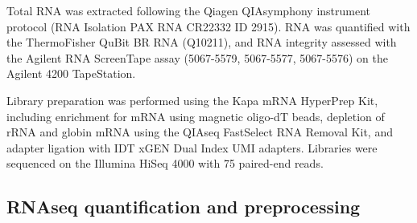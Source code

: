 %

Total RNA was extracted following the Qiagen QIAsymphony instrument protocol (RNA Isolation PAX RNA CR22332 ID 2915).
RNA was quantified with the ThermoFisher QuBit BR RNA (Q10211), 
and RNA integrity assessed with the Agilent RNA ScreenTape assay (5067-5579, 5067-5577, 5067-5576) on the Agilent 4200 TapeStation.

Library preparation was performed using the Kapa mRNA HyperPrep Kit, including enrichment for \gls{mRNA} using magnetic oligo-dT beads, depletion of \gls{rRNA} and globin \gls{mRNA} using the QIAseq FastSelect RNA Removal Kit, and adapter ligation with IDT xGEN Dual Index UMI adapters.
Libraries were sequenced on the Illumina HiSeq 4000 with \SI{75}{\bp} paired-end reads.

\subsection{RNAseq quantification and preprocessing}

